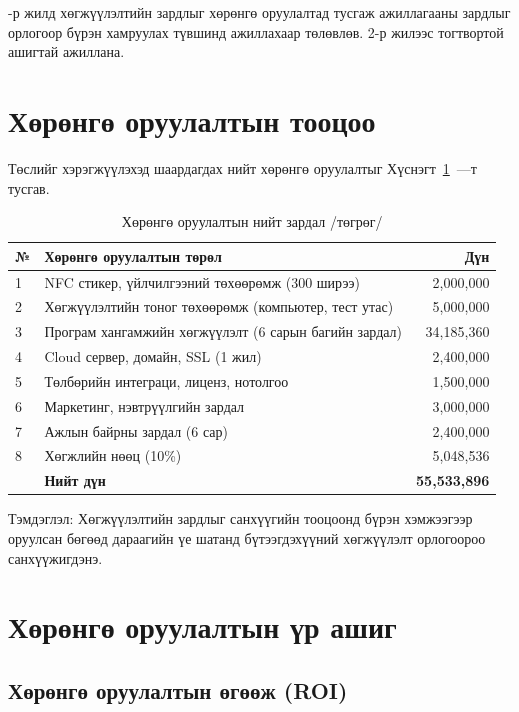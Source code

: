 -р жилд хөгжүүлэлтийн зардлыг хөрөнгө оруулалтад тусгаж
ажиллагааны зардлыг орлогоор бүрэн хамруулах түвшинд ажиллахаар
төлөвлөв. 2-р жилээс тогтвортой ашигтай ажиллана.

\section{Хөрөнгө оруулалтын тооцоо}

Төслийг хэрэгжүүлэхэд шаардагдах нийт хөрөнгө оруулалтыг
Хүснэгт~\ref{tab:ch6-hurungoo}~—т тусгав.

\begin{table}[h]
  \centering
  \caption{Хөрөнгө оруулалтын нийт зардал /төгрөг/}
  \label{tab:ch6-hurungoo}
  \small
  \begin{tabular}{@{}p{0.8cm}p{8.2cm}r@{}}
    \toprule
    \textbf{№} & \textbf{Хөрөнгө оруулалтын төрөл} & \textbf{Дүн} \\
    \midrule
    1 & NFC стикер, үйлчилгээний төхөөрөмж (300 ширээ) & 2{,}000{,}000 \\
    2 & Хөгжүүлэлтийн тоног төхөөрөмж (компьютер, тест утас) & 5{,}000{,}000 \\
    3 & Програм хангамжийн хөгжүүлэлт (6 сарын багийн зардал) & 34{,}185{,}360 \\
    4 & Cloud сервер, домайн, SSL (1 жил) & 2{,}400{,}000 \\
    5 & Төлбөрийн интеграци, лиценз, нотолгоо & 1{,}500{,}000 \\
    6 & Маркетинг, нэвтрүүлгийн зардал & 3{,}000{,}000 \\
    7 & Ажлын байрны зардал (6 сар) & 2{,}400{,}000 \\
    8 & Хөгжлийн нөөц (10\%) & 5{,}048{,}536 \\
    \midrule
    & \textbf{Нийт дүн} & \textbf{55{,}533{,}896} \\
    \bottomrule
  \end{tabular}
\end{table}

\noindent Тэмдэглэл: Хөгжүүлэлтийн зардлыг санхүүгийн тооцоонд
бүрэн хэмжээгээр оруулсан бөгөөд дараагийн үе шатанд бүтээгдэхүүний
хөгжүүлэлт орлогоороо санхүүжигдэнэ.

\section{Хөрөнгө оруулалтын үр ашиг}

\subsection{Хөрөнгө оруулалтын өгөөж (ROI)}

